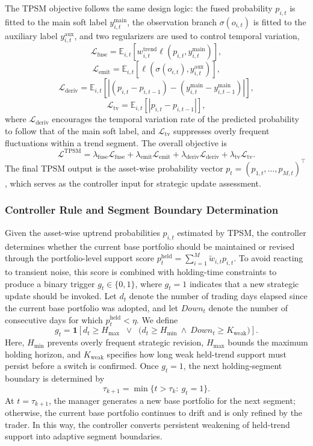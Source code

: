 \documentclass[letterpaper]{article} %
\begin{document}
The TPSM objective follows the same design logic: the fused probability \(p_{i,t}\) is fitted to the main soft label \(y_{i,t}^{\mathrm{main}}\), the observation branch \(\sigma(o_{i,t})\) is fitted to the auxiliary label \(y_{i,t}^{\mathrm{aux}}\), and two regularizers are used to control temporal variation,
\[
\mathcal{L}_{\mathrm{fuse}} = \mathbb{E}_{i,t}\!\left[ w_{i,t}^{\mathrm{trend}} \ell\!\left(p_{i,t},y_{i,t}^{\mathrm{main}}\right) \right],
\]
\[
\mathcal{L}_{\mathrm{emit}} = \mathbb{E}_{i,t}\!\left[ \ell\!\left(\sigma(o_{i,t}),y_{i,t}^{\mathrm{aux}}\right) \right],
\]
\[
\mathcal{L}_{\mathrm{deriv}} = \mathbb{E}_{i,t}\!\left[ \left| (p_{i,t}-p_{i,t-1})-(y_{i,t}^{\mathrm{main}}-y_{i,t-1}^{\mathrm{main}}) \right| \right],
\]
\[
\mathcal{L}_{\mathrm{tv}} = \mathbb{E}_{i,t}\!\left[ |p_{i,t}-p_{i,t-1}| \right],
\]
where \(\mathcal{L}_{\mathrm{deriv}}\) encourages the temporal variation rate of the predicted probability to follow that of the main soft label, and \(\mathcal{L}_{\mathrm{tv}}\) suppresses overly frequent fluctuations within a trend segment. The overall objective is
\[
\mathcal{L}^{\mathrm{TPSM}}
=
\lambda_{\mathrm{fuse}}\mathcal{L}_{\mathrm{fuse}}
+
\lambda_{\mathrm{emit}}\mathcal{L}_{\mathrm{emit}}
+
\lambda_{\mathrm{deriv}}\mathcal{L}_{\mathrm{deriv}}
+
\lambda_{\mathrm{tv}}\mathcal{L}_{\mathrm{tv}}.
\]
The final TPSM output is the asset-wise probability vector \(p_t=(p_{1,t},\dots,p_{M,t})^\top\), which serves as the controller input for strategic update assessment.


\subsubsection{Controller Rule and Segment Boundary Determination}

Given the asset-wise uptrend probabilities \(p_{i,t}\) estimated by TPSM, the controller determines whether the current base portfolio should be maintained or revised through the portfolio-level support score \(p_t^{\mathrm{held}}=\sum_{i=1}^{M}\tilde w_{i,t}p_{i,t}\). To avoid reacting to transient noise, this score is combined with holding-time constraints to produce a binary trigger \(g_t\in\{0,1\}\), where \(g_t=1\) indicates that a new strategic update should be invoked. Let \(d_t\) denote the number of trading days elapsed since the current base portfolio was adopted, and let \(Down_t\) denote the number of consecutive days for which \(p_t^{\mathrm{held}}<\eta\). We define
\[
g_t
=
\mathbf{1}\!\left[
d_t\ge H_{\max}
\;\;\vee\;\;
\bigl(d_t\ge H_{\min}\ \wedge\ Down_t\ge K_{\mathrm{weak}}\bigr)
\right].
\]
Here, \(H_{\min}\) prevents overly frequent strategic revision, \(H_{\max}\) bounds the maximum holding horizon, and \(K_{\mathrm{weak}}\) specifies how long weak held-trend support must persist before a switch is confirmed. Once \(g_t=1\), the next holding-segment boundary is determined by
\[
\tau_{k+1}=\min\{t>\tau_k:\ g_t=1\}.
\]
At \(t=\tau_{k+1}\), the manager generates a new base portfolio for the next segment; otherwise, the current base portfolio continues to drift and is only refined by the trader. In this way, the controller converts persistent weakening of held-trend support into adaptive segment boundaries.
\end{document}
